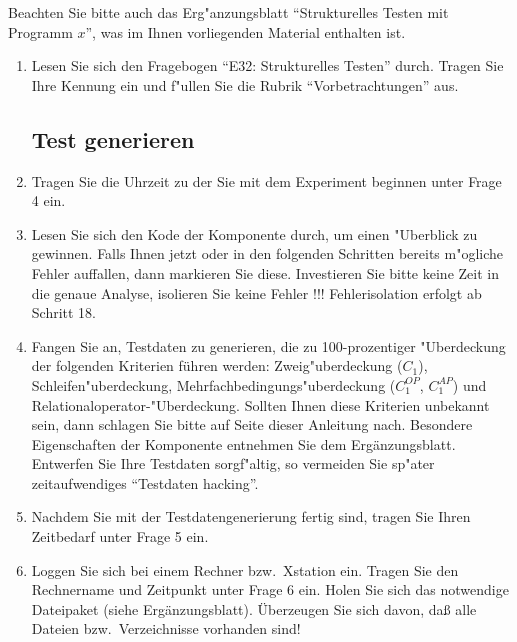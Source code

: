 Beachten Sie bitte auch das Erg"anzungsblatt "`Strukturelles Testen mit
Programm $x$"', was im Ihnen vorliegenden Material enthalten ist.

\begin{enumerate}

\item Lesen Sie sich den Fragebogen "`E32: Strukturelles Testen"'
durch. Tragen Sie Ihre Kennung ein und f"ullen Sie die Rubrik
"`Vorbetrachtungen"' aus. 

\subsection*{Test generieren}

\item Tragen Sie die Uhrzeit zu der Sie mit dem Experiment beginnen 
unter Frage 4 ein.

\item Lesen Sie sich den Kode der Komponente durch, um einen "Uberblick zu
gewinnen. Falls Ihnen jetzt oder in
den folgenden Schritten bereits m"ogliche Fehler auffallen, dann
markieren Sie diese. Investieren Sie bitte keine Zeit in die
genaue Analyse, isolieren Sie keine Fehler !!!
Fehlerisolation erfolgt ab Schritt 18.

\item Fangen Sie an, Testdaten zu generieren, die zu 100-prozentiger
"Uberdeckung der folgenden Kriterien f\"uhren werden: Zweig"uberdeckung
($C_{1}$), Schleifen"uberdeckung, Mehrfachbedingungs"uberdeckung
($C_{1}^{OP}$, $C_{1}^{AP}$) und Relationaloperator-"Uberdeckung.
Sollten Ihnen diese Kriterien unbekannt sein, dann schlagen Sie bitte auf
Seite \pageref{kriterien} dieser Anleitung nach.
Besondere Eigenschaften der Komponente entnehmen Sie dem
Erg\"anzungsblatt.
Entwerfen Sie Ihre Testdaten sorgf"altig, so vermeiden Sie sp"ater
zeitaufwendiges "`Testdaten hacking"'.

\item Nachdem Sie mit der Testdatengenerierung fertig sind, tragen 
Sie Ihren Zeitbedarf unter Frage 5 ein.

\item Loggen Sie sich bei einem Rechner bzw.~Xstation ein.  
Tragen Sie den Rechnername und Zeitpunkt unter Frage 6 ein.  
Holen Sie sich das notwendige Dateipaket (siehe Erg\"anzungsblatt).
\"Uberzeugen Sie sich davon, da{\ss} alle Dateien bzw.~Verzeichnisse
vorhanden sind! 


\end{enumerate}
